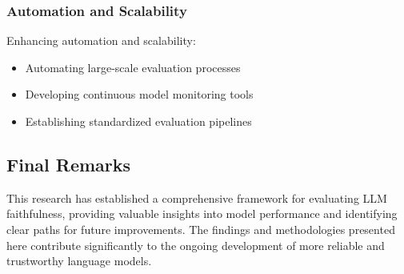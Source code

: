 \vspace{0.5em}
\subsubsection{Automation and Scalability}
Enhancing automation and scalability:
\begin{itemize}
    \item Automating large-scale evaluation processes
    \item Developing continuous model monitoring tools
    \item Establishing standardized evaluation pipelines
\end{itemize}

\vspace{0.5em}
\subsection{Final Remarks}
This research has established a comprehensive framework for evaluating LLM faithfulness, providing valuable insights into model performance and identifying clear paths for future improvements. The findings and methodologies presented here contribute significantly to the ongoing development of more reliable and trustworthy language models.

